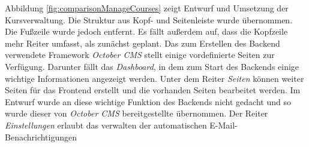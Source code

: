         Abbildung \ref{fig:comparisonManageCourses} zeigt Entwurf und Umsetzung der Kursverwaltung.
        Die Struktur aus Kopf- und Seitenleiste wurde übernommen.
        Die Fußzeile wurde jedoch entfernt.
        Es fällt außerdem auf, dass die Kopfzeile mehr Reiter umfasst, als zunächst geplant.
        Das zum Erstellen des Backend verwendete Framework \textit{October CMS} stellt einige vordefinierte Seiten zur Verfügung.
        Darunter fällt das \textit{Dashboard}, in dem zum Start des Backends einige wichtige Informationen angezeigt werden.
        Unter dem Reiter \textit{Seiten} können weiter Seiten für das Frontend erstellt und die vorhanden Seiten bearbeitet werden.
        Im Entwurf wurde an diese wichtige Funktion des Backends nicht gedacht und so wurde dieser von \textit{October CMS} bereitgestellte  übernommen.
        Der Reiter \textit{Einstellungen} erlaubt das verwalten der automatischen E-Mail-Benachrichtigungen
        
